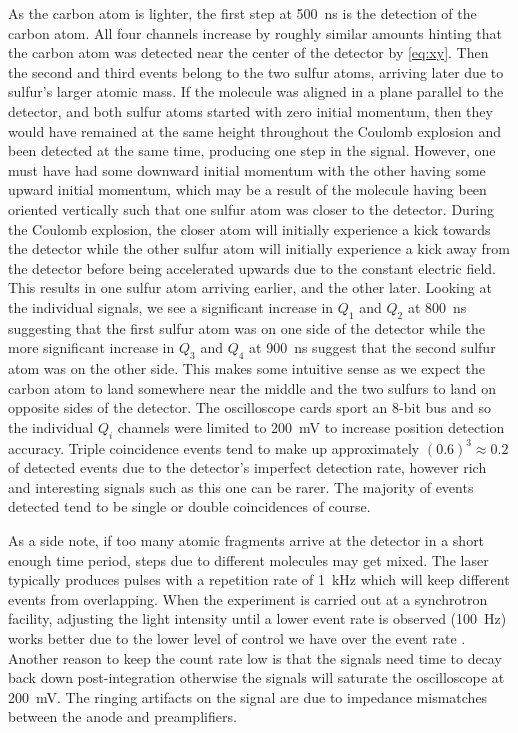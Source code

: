 As the carbon atom is lighter, the first step at \SI{500}{\ns} is the detection of the carbon atom. All four channels increase by roughly similar amounts hinting that the carbon atom was detected near the center of the detector by \eqref{eq:xy}. Then the second and third events belong to the two sulfur atoms, arriving later due to sulfur's larger atomic mass. If the molecule was aligned in a plane parallel to the detector, and both sulfur atoms started with zero initial momentum, then they would have remained at the same height throughout the Coulomb explosion and been detected at the same time, producing one step in the signal. However, one must have had some downward initial momentum with the other having some upward initial momentum, which may be a result of the molecule having been oriented vertically such that one sulfur atom was closer to the detector. During the Coulomb explosion, the closer atom will initially experience a kick towards the detector while the other sulfur atom will initially experience a kick away from the detector before being accelerated upwards due to the constant electric field. This results in one sulfur atom arriving earlier, and the other later. Looking at the individual signals, we see a significant increase in $Q_1$ and $Q_2$ at \SI{800}{\ns} suggesting that the first sulfur atom was on one side of the detector while the more significant increase in $Q_3$ and $Q_4$ at \SI{900}{\ns} suggest that the second sulfur atom was on the other side. This makes some intuitive sense as we expect the carbon atom to land somewhere near the middle and the two sulfurs to land on opposite sides of the detector. The oscilloscope cards sport an 8-bit bus and so the individual $Q_i$ channels were limited to \SI{200}{\mV} to increase position detection accuracy. Triple coincidence events tend to make up approximately $(0.6)^3 \approx 0.2$ of detected events due to the detector's imperfect detection rate, however rich and interesting signals such as this one can be rarer. The majority of events detected tend to be single or double coincidences of course.

As a side note, if too many atomic fragments arrive at the detector in a short enough time period, steps due to different molecules may get mixed. The laser typically produces pulses with a repetition rate of \SI{1}{\kilo\Hz} which will keep different events from overlapping. When the experiment is carried out at a synchrotron facility, adjusting the light intensity until a lower event rate is observed (\SI{100}{\Hz}) works better due to the lower level of control we have over the event rate \citep{Ramadhan16}. Another reason to keep the count rate low is that the signals need time to decay back down post-integration otherwise the signals will saturate the oscilloscope at \SI{200}{\mV}. The ringing artifacts on the signal are due to impedance mismatches between the anode and preamplifiers.

